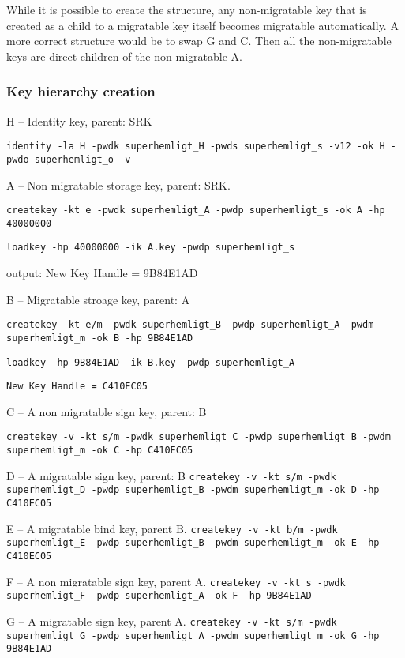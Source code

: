 \documentclass[10pt]{article}
\newcommand{\command}[1]{\texttt{#1}}
\begin{document}
    While it is possible to create the structure, any non-migratable key that
    is created as a child to a migratable key itself becomes migratable
    automatically.  A more correct structure would be to swap G and C.
    Then all the non-migratable keys are direct children of the non-migratable A.

    \subsubsection{Key hierarchy creation}

    H -- Identity key, parent: SRK

    \command{identity -la H -pwdk superhemligt\_H -pwds superhemligt\_s -v12 -ok H -pwdo superhemligt\_o -v}

    A -- Non migratable storage key, parent: SRK.

    \command{createkey -kt e -pwdk superhemligt\_A -pwdp superhemligt\_s -ok A
    -hp 40000000}

    \command{loadkey -hp 40000000 -ik A.key -pwdp superhemligt\_s}

    output: New Key Handle = 9B84E1AD

    B -- Migratable stroage key, parent: A

    \command{createkey -kt e/m -pwdk superhemligt\_B -pwdp superhemligt\_A
    -pwdm \\ superhemligt\_m -ok B -hp 9B84E1AD}

    \command{loadkey -hp 9B84E1AD -ik B.key -pwdp superhemligt\_A}

    \command{New Key Handle = C410EC05}

    C -- A non migratable sign key, parent: B

    \command{createkey -v -kt s/m -pwdk superhemligt\_C -pwdp superhemligt\_B
    -pwdm superhemligt\_m -ok C -hp C410EC05}

    D -- A migratable sign key, parent: B
    \command{createkey -v -kt s/m -pwdk superhemligt\_D -pwdp superhemligt\_B -pwdm superhemligt\_m -ok D -hp C410EC05}

    E -- A migratable bind key, parent B.
    \command{createkey -v -kt b/m -pwdk superhemligt\_E -pwdp superhemligt\_B -pwdm superhemligt\_m -ok E -hp C410EC05}

    F -- A non migratable sign key, parent A.
    \command{createkey -v -kt s -pwdk superhemligt\_F -pwdp superhemligt\_A -ok F -hp 9B84E1AD}

    G -- A migratable sign key, parent A.
    \command{createkey -v -kt s/m -pwdk superhemligt\_G -pwdp superhemligt\_A -pwdm superhemligt\_m -ok G -hp 9B84E1AD}
\end{document}
